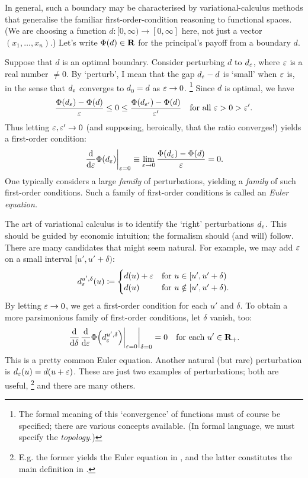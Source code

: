 In general, such a boundary may be characterised by variational-calculus methods that generalise the familiar first-order-condition reasoning to functional spaces.
(We are choosing a function $d : [0,\infty) \to [0,\infty]$ here, not just a vector $(x_1,\dots,x_n)$.)
Let's write $\Phi(d) \in \mathbf{R}$ for the principal's payoff from a boundary $d$.

Suppose that $d$ is an optimal boundary.
Consider perturbing $d$ to $d_\varepsilon$, where $\varepsilon$ is a real number $\neq 0$.
By `perturb', I mean that the gap $d_\varepsilon-d$ is `small' when $\varepsilon$ is, 
in the sense that $d_\varepsilon$ converges to $d_0 = d$ as $\varepsilon \to 0$.%
	\footnote{The formal meaning of this `convergence' of functions must of course be specified; there are various concepts available. (In formal language, we must specify the \emph{topology.})}
Since $d$ is optimal, we have
%
\begin{equation*}
	\frac{ \Phi(d_\varepsilon) - \Phi(d) }{ \varepsilon }
	\leq 0
	\leq \frac{ \Phi(d_{\varepsilon'}) - \Phi(d) }{ \varepsilon' }
	\quad \text{for all $\varepsilon>0>\varepsilon'$.}
\end{equation*}
%
Thus letting $\varepsilon,\varepsilon' \to 0$
(and supposing, heroically, that the ratio converges!)
yields a first-order condition:
%
\begin{equation*}
	\left. \frac{\dd}{\dd \eps} \Phi(d_\eps) \right|_{\eps=0}
	\equiv \lim_{\eps \to 0} \frac{ \Phi(d_\eps) - \Phi(d) }{ \eps }
	= 0 .
\end{equation*}
%
One typically considers a large \emph{family} of perturbations, yielding a \emph{family} of such first-order conditions.
Such a family of first-order conditions is called an \emph{Euler equation.}

The art of variational calculus is to identify the `right' perturbations $d_\varepsilon$.
This should be guided by economic intuition; the formalism should (and will) follow.
There are many candidates that might seem natural.
For example, we may add $\varepsilon$ on a small interval $[u',u'+\delta)$:
%
\begin{equation*}
	d^{u',\delta}_\varepsilon(u)
	\coloneqq
	\begin{cases}
		d(u) + \varepsilon 
		&\text{for $u \in [u',u'+\delta)$} \\
		d(u)
		&\text{for $u \notin [u',u'+\delta)$.} 
	\end{cases}
\end{equation*}
%
By letting $\varepsilon \to 0$, we get a first-order condition for each $u'$ and $\delta$. To obtain a more parsimonious family of first-order conditions, let $\delta$ vanish, too:
%
\begin{equation*}
	\left. \frac{\dd}{\dd \delta} \left. \frac{\dd}{\dd \eps}
	\Phi\left( d^{u',\delta}_\eps \right)
	\right|_{\eps=0} \right|_{\delta=0}
	= 0
	\quad \text{for each $u' \in \R_+$.}
\end{equation*}
%
This is a pretty common Euler equation.
Another natural (but rare) perturbation is $d_\varepsilon(u) = d(u+\varepsilon)$.
These are just two examples of perturbations;
both are useful,%
	\footnote{E.g. the former yields the Euler equation in \textcite{sfb}, and the latter constitutes the main definition in \textcite{Sinander2021}.}
and there are many others.

